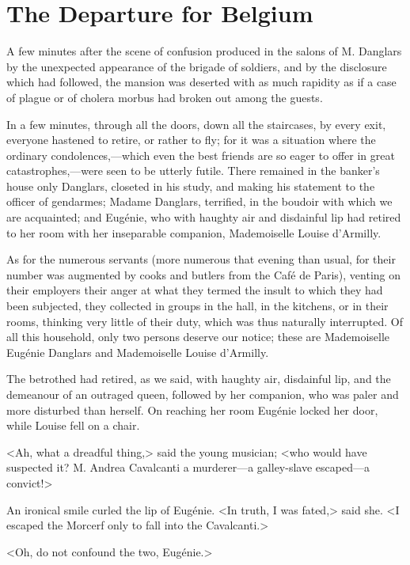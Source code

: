 \chapter{The Departure for Belgium}
	
	\lettrine{A}{} few minutes after the scene of confusion produced in the salons of M. Danglars by the unexpected appearance of the brigade of soldiers, and by the disclosure which had followed, the mansion was deserted with as much rapidity as if a case of plague or of cholera morbus had broken out among the guests. 

 In a few minutes, through all the doors, down all the staircases, by every exit, everyone hastened to retire, or rather to fly; for it was a situation where the ordinary condolences,—which even the best friends are so eager to offer in great catastrophes,—were seen to be utterly futile. There remained in the banker's house only Danglars, closeted in his study, and making his statement to the officer of gendarmes; Madame Danglars, terrified, in the boudoir with which we are acquainted; and Eugénie, who with haughty air and disdainful lip had retired to her room with her inseparable companion, Mademoiselle Louise d'Armilly. 

 As for the numerous servants (more numerous that evening than usual, for their number was augmented by cooks and butlers from the Café de Paris), venting on their employers their anger at what they termed the insult to which they had been subjected, they collected in groups in the hall, in the kitchens, or in their rooms, thinking very little of their duty, which was thus naturally interrupted. Of all this household, only two persons deserve our notice; these are Mademoiselle Eugénie Danglars and Mademoiselle Louise d'Armilly. 

 The betrothed had retired, as we said, with haughty air, disdainful lip, and the demeanour of an outraged queen, followed by her companion, who was paler and more disturbed than herself. On reaching her room Eugénie locked her door, while Louise fell on a chair. 

 <Ah, what a dreadful thing,> said the young musician; <who would have suspected it? M. Andrea Cavalcanti a murderer—a galley-slave escaped—a convict!> 

 An ironical smile curled the lip of Eugénie. <In truth, I was fated,> said she. <I escaped the Morcerf only to fall into the Cavalcanti.> 

 <Oh, do not confound the two, Eugénie.> 

